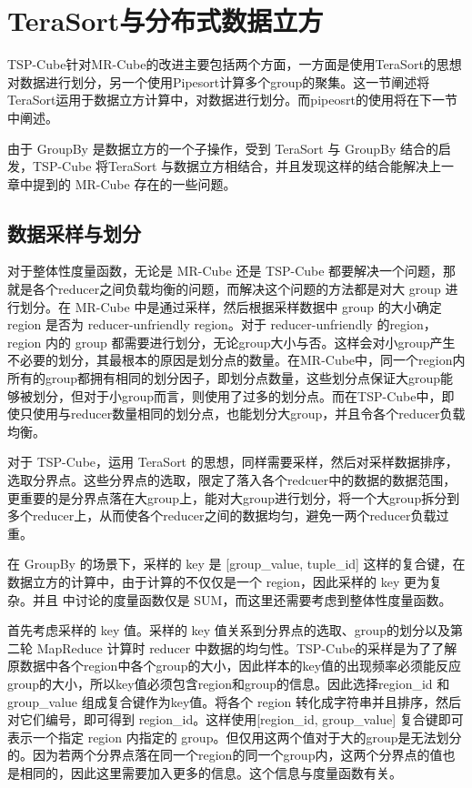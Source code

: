 \section{TeraSort与分布式数据立方}

TSP-Cube针对MR-Cube的改进主要包括两个方面，一方面是使用TeraSort的思想对数据进行划分，另一个使用Pipesort计算多个group的聚集。这一节阐述将TeraSort运用于数据立方计算中，对数据进行划分。而pipeosrt的使用将在下一节中阐述。

由于 GroupBy 是数据立方的一个子操作，受到 TeraSort 与 GroupBy 结合的启发，TSP-Cube 将TeraSort 与数据立方相结合，并且发现这样的结合能解决上一章中提到的 MR-Cube 存在的一些问题。


\subsection{数据采样与划分}

对于整体性度量函数，无论是 MR-Cube 还是 TSP-Cube 都要解决一个问题，那就是各个reducer之间负载均衡的问题，而解决这个问题的方法都是对大 group 进行划分。在 MR-Cube 中是通过采样，然后根据采样数据中 group 的大小确定 region 是否为 reducer-unfriendly region。对于 reducer-unfriendly 的region，region 内的 group 都需要进行划分，无论group大小与否。这样会对小group产生不必要的划分，其最根本的原因是划分点的数量。在MR-Cube中，同一个region内所有的group都拥有相同的划分因子，即划分点数量，这些划分点保证大group能够被划分，但对于小group而言，则使用了过多的划分点。而在TSP-Cube中，即使只使用与reducer数量相同的划分点，也能划分大group，并且令各个reducer负载均衡。

对于 TSP-Cube，运用 TeraSort 的思想，同样需要采样，然后对采样数据排序，选取分界点。这些分界点的选取，限定了落入各个redcuer中的数据的数据范围，更重要的是分界点落在大group上，能对大group进行划分，将一个大group拆分到多个reducer上，从而使各个reducer之间的数据均匀，避免一两个reducer负载过重。

在 GroupBy 的场景下，采样的 key 是 [group\_value, tuple\_id] 这样的复合键，在数据立方的计算中，由于计算的不仅仅是一个 region，因此采样的 key 更为复杂。并且\cite{tao2013minimal} 中讨论的度量函数仅是 SUM，而这里还需要考虑到整体性度量函数。

首先考虑采样的 key 值。采样的 key 值关系到分界点的选取、group的划分以及第二轮 MapReduce 计算时 reducer 中数据的均匀性。TSP-Cube的采样是为了了解原数据中各个region中各个group的大小，因此样本的key值的出现频率必须能反应group的大小，所以key值必须包含region和group的信息。因此选择region\_id 和group\_value 组成复合键作为key值。将各个 region 转化成字符串并且排序，然后对它们编号，即可得到 region\_id。这样使用[region\_id, group\_value] 复合键即可表示一个指定 region 内指定的 group。但仅用这两个值对于大的group是无法划分的。因为若两个分界点落在同一个region的同一个group内，这两个分界点的值也是相同的，因此这里需要加入更多的信息。这个信息与度量函数有关。

